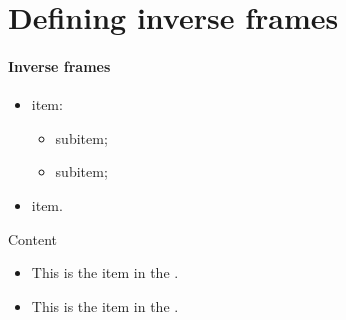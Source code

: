 \setcounter{chapter}{4}
\chapter{Defining inverse frames}
\label{chap:inverse_frames}

\begin{inverseframe}
\frametitle{Inverse frames}

\begin{itemize}
\item {} item:
\begin{itemize}
\normalsize
\item {} subitem;
\item {} subitem;
\end{itemize}
\item {}  item.
\end{itemize}

\begin{block}{Content}
\begin{itemize}
\item This is the  item in the .
\item This is the  item in the .
\end{itemize}
\end{block}
\end{inverseframe}
